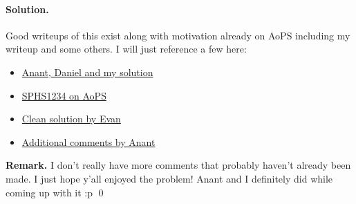 \documentclass[12pt]{article}
\newenvironment{solution}
{\paragraph{Solution.}}
{\qed\eject}
\begin{document}
\begin{solution}
    Good writeups of this exist along with motivation already on AoPS including my writeup and some others. I will just reference a few here:
    \begin{itemize}
        \item \href{https://artofproblemsolving.com/community/c6h2995081p26888716}{Anant, Daniel and my solution}
        \item \href{https://artofproblemsolving.com/community/c6h2995081p26888736}{SPHS1234 on AoPS}
        \item \href{https://artofproblemsolving.com/community/c6h2995081p26929630}{Clean solution by Evan}
        \item \href{https://artofproblemsolving.com/community/c6h2995081p26889238}{Additional comments by Anant}
    \end{itemize}

\textbf{Remark.} I don't really have more comments that probably haven't already been made. I just hope y'all enjoyed the problem! Anant and I definitely did while coming up with it :p
\end{solution}
\end{document}
